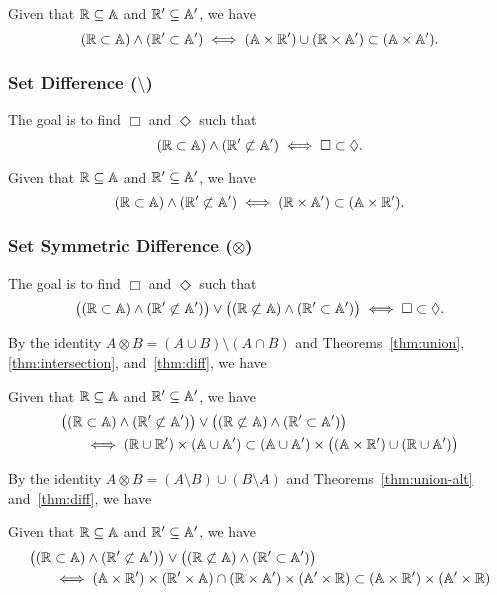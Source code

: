 \begin{theorem}  \label{thm:intersection}
  Given that $\mathbb{R} \subseteq \mathbb{A}$ and $\mathbb{R}' \subseteq \mathbb{A}'$, we have
  \[
    (\mathbb{R} \subset \mathbb{A}) \land (\mathbb{R}' \subset \mathbb{A}') \iff (\mathbb{A} \times \mathbb{R}') \cup (\mathbb{R} \times \mathbb{A}') \subset (\mathbb{A} \times \mathbb{A}').
  \]
\end{theorem}
\subsubsection{Set Difference ($\setminus$)}

The goal is to find $\Box$ and $\Diamond$ such that
\[
  (\mathbb{R} \subset \mathbb{A}) \land (\mathbb{R}' \not\subset \mathbb{A}') \iff \Box \subset \Diamond.
\]

\begin{theorem}  \label{thm:diff}
  Given that $\mathbb{R} \subseteq \mathbb{A}$ and $\mathbb{R}' \subseteq \mathbb{A}'$, we have 
  \[
    (\mathbb{R} \subset \mathbb{A}) \land (\mathbb{R}' \not\subset \mathbb{A}') \iff (\mathbb{R} \times \mathbb{A}') \subset (\mathbb{A} \times \mathbb{R}').
  \]
\end{theorem}
\subsubsection{Set Symmetric Difference ($\otimes$)}

The goal is to find $\Box$ and $\Diamond$ such that
\[
  \big((\mathbb{R} \subset \mathbb{A}) \land (\mathbb{R}' \not\subset \mathbb{A}')\big) \lor 
  \big((\mathbb{R} \not\subset \mathbb{A}) \land (\mathbb{R}' \subset \mathbb{A}')\big) \iff \Box \subset \Diamond.
\]

By the identity $A \otimes B = (A \cup B) \setminus (A \cap B)$ 
and Theorems~\ref{thm:union}, \ref{thm:intersection}, and~\ref{thm:diff}, we have
\begin{theorem}  \label{thm:sym-diff}
  Given that $\mathbb{R} \subseteq \mathbb{A}$ and $\mathbb{R}' \subseteq \mathbb{A}'$, we have
  \begin{align*}
    \big((\mathbb{R} &\subset \mathbb{A}) \land (\mathbb{R}' \not\subset \mathbb{A}')\big) \lor 
    \big((\mathbb{R} \not\subset \mathbb{A}) \land (\mathbb{R}' \subset \mathbb{A}')\big) \\
    & \iff (\mathbb{R} \cup \mathbb{R}') \times (\mathbb{A} \cup \mathbb{A}') \subset (\mathbb{A} \cup \mathbb{A}') \times \big((\mathbb{A} \times \mathbb{R}') \cup (\mathbb{R} \cup \mathbb{A}')\big)
  \end{align*}
\end{theorem}

By the identity $A \otimes B = (A \setminus B) \cup (B \setminus A)$ 
and Theorems~\ref{thm:union-alt} and~\ref{thm:diff}, we have	
\begin{theorem}  \label{thm:sym-diff-alt}
  Given that $\mathbb{R} \subseteq \mathbb{A}$ and $\mathbb{R}' \subseteq \mathbb{A}'$, we have
  \begin{align*}
    \big((\mathbb{R} &\subset \mathbb{A}) \land (\mathbb{R}' \not\subset \mathbb{A}')\big) \lor 
    \big((\mathbb{R} \not\subset \mathbb{A}) \land (\mathbb{R}' \subset \mathbb{A}')\big) \\
    & \iff (\mathbb{A} \times \mathbb{R}') \times (\mathbb{R}' \times \mathbb{A}) \cap (\mathbb{R} \times \mathbb{A}') \times (\mathbb{A}' \times \mathbb{R}) \subset (\mathbb{A} \times \mathbb{R}') \times (\mathbb{A}' \times \mathbb{R})
  \end{align*}
\end{theorem}
